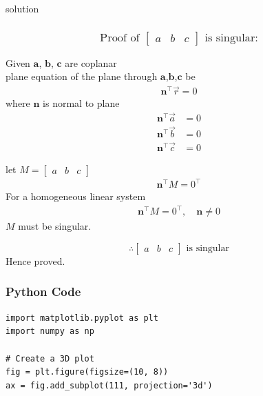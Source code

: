 \documentclass{beamer}
\begin{document}
\begin{frame}{solution}
\frametitle{\[\text {Proof of } \begin{bmatrix} a & b & c \end{bmatrix} \text{ is singular:}\]}
Given $\mathbf{a}$, $\mathbf{b}$, $\mathbf{c}$ are coplanar\\
plane equation of the plane through  $\mathbf{a}$,$\mathbf{b}$,$\mathbf{c}$ be 
\begin{align}
\mathbf{n}^\top \Vec{r} = 0
\end{align}
where $\mathbf{n}$ is normal to plane
\begin{align}
\mathbf{n}^\top \Vec{a} &= 0 \\
\mathbf{n}^\top \Vec{b} &= 0 \\
\mathbf{n}^\top \Vec{c} &= 0
\end{align}
\end{frame}
\begin{frame}
let $M = \begin{bmatrix} a & b & c \end{bmatrix}$
\begin{align}
\mathbf{n}^\top M = 0^\top
\end{align}
For a homogeneous linear system
\begin{align}
\mathbf{n}^\top M = 0^\top, \quad \mathbf{n} \neq 0
\end{align}
$M$ must be singular.

\[\therefore \begin{bmatrix} a & b & c \end{bmatrix} \text{ is singular}\]
Hence proved.

\end{frame}


\begin{frame}[fragile]
    \frametitle{Python Code}
    \begin{lstlisting}
import matplotlib.pyplot as plt
import numpy as np

# Create a 3D plot
fig = plt.figure(figsize=(10, 8))
ax = fig.add_subplot(111, projection='3d')

\end{lstlisting}
\end{frame}
\end{document}
